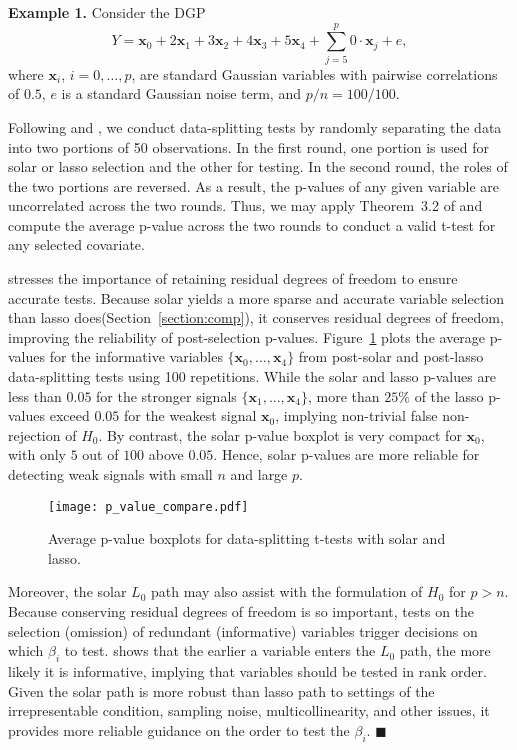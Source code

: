 \documentclass[11pt,review,authoryear]{elsarticle}
\begin{document}
\smallskip
\noindent
\textbf{Example 1.} Consider the DGP
%
\begin{equation}
  Y = \mathbf{x}_0 + 2 \mathbf{x}_1 + 3 \mathbf{x}_2 + 4 \mathbf{x}_3 + 5 \mathbf{x}_4 + \sum_{j=5}^{p} 0 \cdot \mathbf{x}_j + e,
\end{equation}
%
where $\mathbf{x}_i$, $i=0,\dots,p$, are standard Gaussian variables with pairwise correlations of $0.5$, $e$ is a standard Gaussian noise term, and $p/n=100/100$.

Following \citet[Example~4.1]{romano2019multiple} and \citet{diciccio2020exact}, we conduct data-splitting tests by randomly separating the data into two portions of 50 observations. In the first round, one portion is used for solar or lasso selection and the other for testing. In the second round, the roles of the two portions are reversed. As a result, the p-values of any given variable are uncorrelated across the two rounds. Thus, we may apply Theorem~3.2 of \citet{romano2019multiple} and compute the average p-value across the two rounds to conduct a valid t-test for any selected covariate.

\citet{diciccio2020exact} stresses the importance of retaining residual degrees of freedom to ensure accurate tests. Because solar yields a more sparse and accurate variable selection than lasso does(Section~\ref{section:comp}), it conserves residual degrees of freedom, improving the reliability of post-selection p-values. Figure~\ref{fig:p_value_compare} plots the average p-values for the informative variables $\{\mathbf{x}_0,\ldots,\mathbf{x}_4\}$ from post-solar and post-lasso data-splitting tests using 100 repetitions. While the solar and lasso p-values are less than $0.05$ for the stronger signals $\{\mathbf{x}_1,\ldots,\mathbf{x}_4\}$, more than $25\%$ of the lasso p-values exceed $0.05$ for the weakest signal $\mathbf{x}_0$, implying non-trivial false non-rejection of $H_0$. By contrast, the solar p-value boxplot is very compact for $\mathbf{x}_0$, with only $5$ out of $100$ above $0.05$. Hence, solar p-values are more reliable for detecting weak signals with small $n$ and large $p$.

\begin{figure}[ht]
%
  \centering
%
  \texttt{[image: p\_value\_compare.pdf]}
%
  \caption{Average p-value boxplots for data-splitting t-tests with solar and lasso.}
%
  \label{fig:p_value_compare}
%
\end{figure}

Moreover, the solar $L_0$ path may also assist with the formulation of $H_0$ for $p>n$. Because conserving residual degrees of freedom is so important, tests on the selection (omission) of redundant (informative) variables trigger decisions on which $\beta_i$ to test. \citet[Theorem~2]{zhang09} shows that the earlier a variable enters the $L_0$ path, the more likely it is informative, implying that variables should be tested in rank order. Given the solar path is more robust than lasso path to settings of the irrepresentable condition, sampling noise, multicollinearity, and other issues, it provides more reliable guidance on the order to test the $\beta_i$. $\blacksquare$
\end{document}
